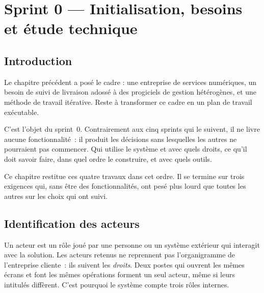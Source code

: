 %
\chapter{Sprint 0 — Initialisation, besoins et étude technique}
\label{ch:sprint0}

\section{Introduction}

Le chapitre précédent a posé le cadre : une entreprise de services numériques, un besoin de suivi de
livraison adossé à des progiciels de gestion hétérogènes, et une méthode de travail itérative. Reste
à transformer ce cadre en un plan de travail exécutable.

C'est l'objet du sprint~0. Contrairement aux cinq sprints qui le suivent, il ne livre aucune
fonctionnalité~: il produit les décisions sans lesquelles les autres ne pourraient pas commencer.
Qui utilise le système et avec quels droits, ce qu'il doit savoir faire, dans quel ordre le
construire, et avec quels outils.

Ce chapitre restitue ces quatre travaux dans cet ordre. Il se termine sur trois exigences qui, sans
être des fonctionnalités, ont pesé plus lourd que toutes les autres sur les choix qui ont suivi.

\section{Identification des acteurs}

Un acteur est un rôle joué par une personne ou un système extérieur qui interagit avec la solution.
Les acteurs retenus ne reprennent pas l'organigramme de l'entreprise cliente~: ils suivent les
\emph{droits}. Deux postes qui ouvrent les mêmes écrans et font les mêmes opérations forment un seul
acteur, même si leurs intitulés diffèrent. C'est pourquoi le système compte trois rôles internes.

